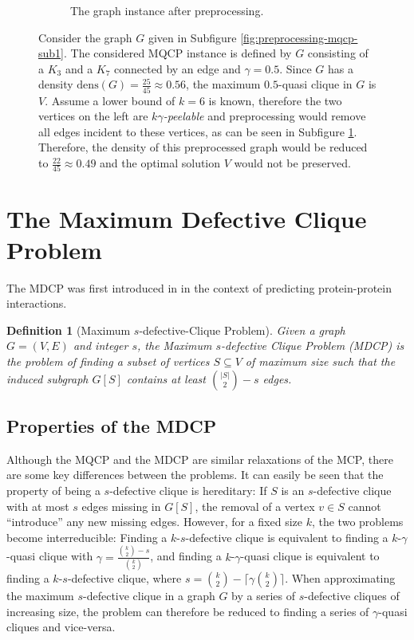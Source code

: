 \documentclass[draft,final]{vutinfth} %
\newtheorem{definition}{Definition}[section]
\begin{document}
\begin{figure}
\begin{subfigure}{.5\textwidth}
      \caption{The graph instance after preprocessing.}
      \label{fig:preprocessing-mqcp-sub2}
    \end{subfigure}
    \caption{Consider the graph $G$ given in Subfigure \ref{fig:preprocessing-mqcp-sub1}. The considered MQCP instance is defined by $G$ consisting of a $K_3$ and a $K_7$ connected by an edge and $\gamma=0.5$. Since $G$ has a density $\mathrm{dens}(G) = \frac{25}{45} \approx 0.56$, the maximum $0.5$-quasi clique in $G$ is $V$. Assume a lower bound of $k=6$ is known, therefore the two vertices on the left are $k\gamma$\emph{-peelable} and preprocessing would remove all edges incident to these vertices, as can be seen in Subfigure \ref{fig:preprocessing-mqcp-sub2}. Therefore, the density of this preprocessed graph would be reduced to $\frac{22}{45} \approx 0.49$ and the optimal solution $V$ would not be preserved.}
    \label{fig:preprocessing-mqcp-counterexample}
\end{figure}

\section{The Maximum Defective Clique Problem}\label{sec:mdcp}

The MDCP was first introduced in \cite{Yu2006} in the context of predicting protein-protein interactions. 

\begin{definition}[Maximum $s$-defective-Clique Problem]
	\label{def:mdcp}
	Given a graph \\ 
    $G = (V,E)$ and integer $s$, the Maximum $s$-defective Clique Problem (MDCP) is the problem of finding a subset of vertices $S \subseteq V$ of maximum size 
	such that the induced subgraph $G[S]$ contains at least $\binom{|S|}{2} - s$ edges. 
\end{definition}

\subsection{Properties of the MDCP}

Although the MQCP and the MDCP are similar relaxations of the MCP, there are some key differences between the problems. It can easily be seen that the property of being a $s$-defective clique is hereditary: If $S$ is an $s$-defective clique with at most $s$ edges missing in $G[S]$, the removal of a vertex $v \in S$ cannot ``introduce'' any new missing edges.  
However, for a fixed size $k$, the two problems become interreducible: 
Finding a $k$-$s$-defective clique is equivalent to finding a $k$-$\gamma$-quasi clique with $\gamma = \frac{\binom{k}{2} - s}{\binom{k}{2}} $, and finding a $k$-$\gamma$-quasi clique is equivalent to finding a $k$-$s$-defective clique, where $s = \binom{k}{2} - \lceil \gamma \binom{k}{2} \rceil$. 
When approximating the maximum $s$-defective clique in a graph $G$ by a series of $s$-defective cliques of increasing size, the problem can therefore be reduced to finding a series of $\gamma$-quasi cliques and vice-versa.
\end{document}
